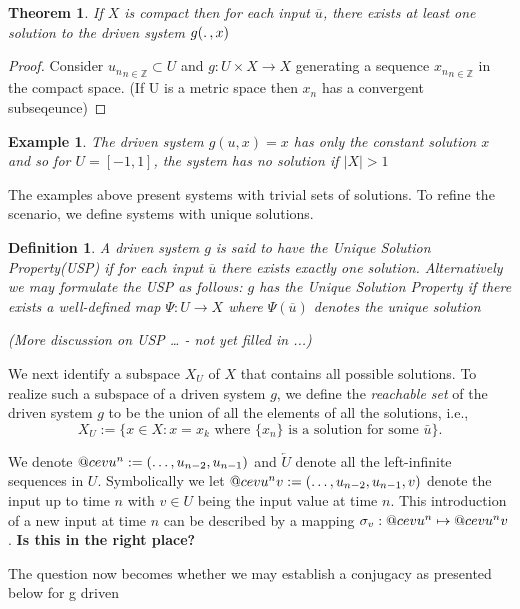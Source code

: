 \documentclass[12 pt]{article}
\makeatletter
\DeclareRobustCommand{\cev}[1]{%
  \mathpalette\do@cev{#1}%
}
\newcommand{\do@cev}[2]{%
  \fix@cev{#1}{+}%
  \reflectbox{$\m@th#1\vec{\reflectbox{$\fix@cev{#1}{-}\m@th#1#2\fix@cev{#1}{+}$}}$}%
  \fix@cev{#1}{-}%
}
\newcommand{\fix@cev}[2]{%
  \ifx#1\displaystyle
    \mkern#20mu
  \else
    \ifx#1\textstyle
      \mkern#20mu
    \else
      \ifx#1\scriptstyle
        \mkern#26mu
      \else
        \mkern#26mu
      \fi
    \fi
  \fi
}
\newtheorem{Definition}{Definition}[]
\newtheorem{Theorem}{Theorem}[]
\newtheorem{Example}{Example}[]
\makeatother
\begin{document}
\begin{Theorem}
  If $X$ is compact then for each input $\overline{u}$, there exists at least one solution to the driven system $g(\ldotp, x)$
\end{Theorem}
\begin{proof}
  Consider ${u_n}_{n\in\mathbb{Z}}\subset{U}$ and $g:U\times{X}\to{X}$  generating a sequence ${x_n}_{n\in\mathbb{Z}}$ in the compact space. (If U is a metric space then $x_n$ has a convergent subseqeunce)
\end{proof}

\begin{Example}
  The driven system $g(u,x)=x$ has only the constant solution $x$ and so for $U=[-1,1]$, the system has no solution if $|X|>1$
\end{Example}

The examples above present systems with trivial sets of solutions. To refine the scenario, we define systems with unique solutions. 

\begin{Definition}
  A driven system $g$ is said to have the Unique Solution Property(USP) if for each input $\overline{u}$ there exists exactly one solution. Alternatively we may formulate the USP as follows: $g$ has the Unique Solution Property if there exists a well-defined map $\Psi:{U}\to{X}$ where $\Psi({\overline{u}})$ denotes the unique solution 
\end{Definition}

\emph{(More discussion on USP … - not yet filled in ...)}

We next identify a subspace $X_U$ of $X$ that contains all possible solutions. To realize such a subspace of a driven system $g$, we define 
the \textit{reachable set} of the driven system $g$ to be the union of all the elements of all the solutions, i.e., 
$$X_U :=\Big \{x \in X:  x = x_k \mbox{ where  $\{x_n\}$  is a solution for some  $\bar{u}$} \Big \}.$$

We denote $\cev{u}^{n}:=(\ldots,u_{n-2} ,u_{n-1})$ and $\overleftarrow{U}$ denote all the left-infinite sequences in $U$. 
Symbolically we let $\cev{u}^{n}v:=(\ldots,u_{n-2} ,u_{n-1}, v)$ denote the input up to time $n$ with $v \in U$ being the input value at time $n$. This introduction of a new input at time $n$ can be described by a mapping $\sigma_v:   
\cev{u}^{n} \mapsto \cev{u}^{n}v$.   \textbf{Is this in the right place?}


The question now becomes whether we may establish a conjugacy as presented below for g driven
\end{document}
